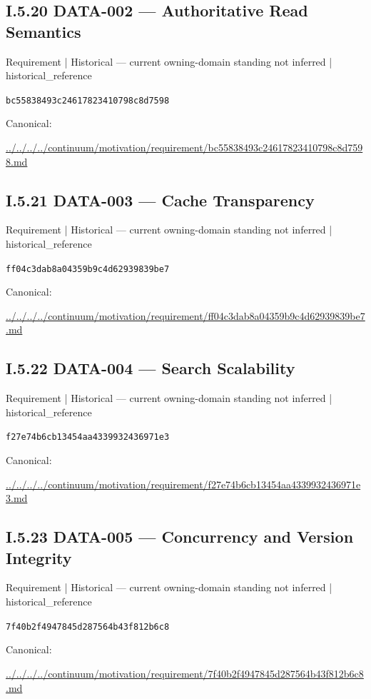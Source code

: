 \documentclass[10pt,a4paper]{article}
\begin{document}
\subsection*{I.5.20 DATA-002 — Authoritative Read Semantics}
\label{element-bc55838493c24617823410798c8d7598}
{\small Requirement | Historical — current owning-domain standing not inferred | historical\_reference}\par
\texttt{bc55838493c24617823410798c8d7598}\par
Canonical: \par
{\footnotesize\url{../../../../continuum/motivation/requirement/bc55838493c24617823410798c8d7598.md}}\par
\subsection*{I.5.21 DATA-003 — Cache Transparency}
\label{element-ff04c3dab8a04359b9c4d62939839be7}
{\small Requirement | Historical — current owning-domain standing not inferred | historical\_reference}\par
\texttt{ff04c3dab8a04359b9c4d62939839be7}\par
Canonical: \par
{\footnotesize\url{../../../../continuum/motivation/requirement/ff04c3dab8a04359b9c4d62939839be7.md}}\par
\subsection*{I.5.22 DATA-004 — Search Scalability}
\label{element-f27e74b6cb13454aa4339932436971e3}
{\small Requirement | Historical — current owning-domain standing not inferred | historical\_reference}\par
\texttt{f27e74b6cb13454aa4339932436971e3}\par
Canonical: \par
{\footnotesize\url{../../../../continuum/motivation/requirement/f27e74b6cb13454aa4339932436971e3.md}}\par
\subsection*{I.5.23 DATA-005 — Concurrency and Version Integrity}
\label{element-7f40b2f4947845d287564b43f812b6c8}
{\small Requirement | Historical — current owning-domain standing not inferred | historical\_reference}\par
\texttt{7f40b2f4947845d287564b43f812b6c8}\par
Canonical: \par
{\footnotesize\url{../../../../continuum/motivation/requirement/7f40b2f4947845d287564b43f812b6c8.md}}\par
\end{document}
